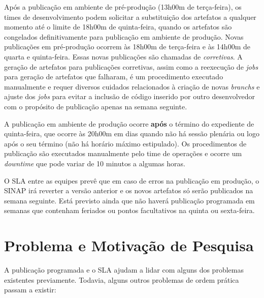 Após a publicação em ambiente de pré-produção (13h00m de terça-feira), os times
de desenvolvimento podem solicitar a substituição dos artefatos a qualquer
momento até o limite de 18h00m de quinta-feira, quando os artefatos são
congelados definitivamente para publicação em ambiente de produção. Novas
publicações em pré-produção ocorrem às 18h00m de terça-feira e às 14h00m de
quarta e quinta-feira. Essas novas publicações são chamadas de \emph{corretivas}.
A geração de artefatos para publicações corretivas, assim como a reexecução
de \textit{jobs} para geração de artefatos que falharam, é um procedimento
executado manualmente e requer diversos cuidados relacionados à criação de novas
\textit{branchs} e ajuste dos \textit{jobs} para evitar a inclusão de código
inserido por outro desenvolvedor com o propósito de publicação apenas na semana
seguinte.

A publicação em ambiente de produção ocorre \textbf{após} o término do
expediente de quinta-feira, que ocorre às 20h00m em dias quando não há sessão
plenária ou logo após o seu término (não há horário máximo estipulado).
Os procedimentos de publicação são executados manualmente pelo time de
operações e ocorre um \textit{downtime} que pode variar de 10 minutos a algumas
horas.

O \acrshort{SLA} entre as equipes prevê que em caso de erros na publicação em
produção, o \acrshort{SINAP} irá reverter a versão anterior e os novos
artefatos só serão publicados na semana seguinte. Está previsto ainda que
não haverá publicação programada em semanas que contenham feriados ou pontos
facultativos na quinta ou sexta-feira.

\section{Problema e Motivação de Pesquisa}%

A publicação programada e o \acrshort{SLA} ajudam a lidar com alguns dos
problemas existentes previamente. Todavia, alguns outros problemas de ordem
prática passam a existir:


